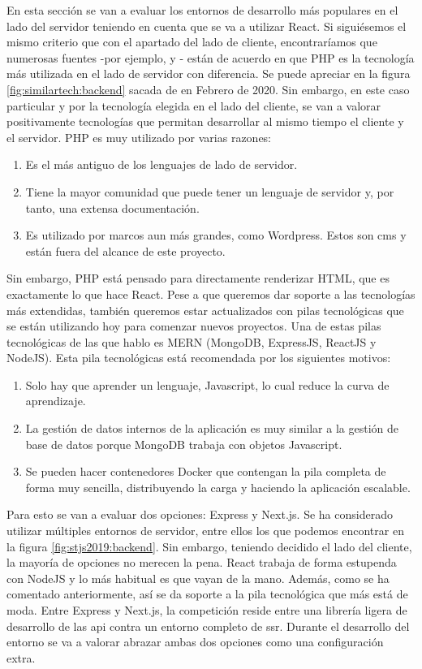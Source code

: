 En esta sección se van a evaluar los entornos de desarrollo más populares en el lado del servidor teniendo en cuenta que se va a utilizar React. Si siguiésemos el mismo criterio que con el apartado del lado de cliente, encontraríamos que numerosas fuentes -por ejemplo, \cite{BKETPF1} y \cite{BKETPF2}- están de acuerdo en que PHP es la tecnología más utilizada en el lado de servidor con diferencia. Se puede apreciar en la figura \cref{fig:similartech:backend} sacada de \cite{BKETPF2} en Febrero de 2020. Sin embargo, en este caso particular y por la tecnología elegida en el lado del cliente, se van a valorar positivamente tecnologías que permitan desarrollar al mismo tiempo el cliente y el servidor. PHP es muy utilizado por varias razones:

\begin{enumerate}
	\item Es el más antiguo de los lenguajes de lado de servidor.
	\item Tiene la mayor comunidad que puede tener un lenguaje de servidor y, por tanto, una extensa documentación.
	\item Es utilizado por marcos aun más grandes, como Wordpress. Estos son \gls{cms} y están fuera del alcance de este proyecto.
\end{enumerate}

Sin embargo, PHP está pensado para directamente renderizar HTML, que es exactamente lo que hace React. Pese a que queremos dar soporte a las tecnologías más extendidas, también queremos estar actualizados con pilas tecnológicas que se están utilizando hoy para comenzar nuevos proyectos. Una de estas pilas tecnológicas de las que hablo es MERN (MongoDB, ExpressJS, ReactJS y NodeJS). Esta pila tecnológicas está recomendada por los siguientes motivos:

\begin{enumerate}
	\item Solo hay que aprender un lenguaje, Javascript, lo cual reduce la curva de aprendizaje.
	\item La gestión de datos internos de la aplicación es muy similar a la gestión de base de datos porque MongoDB trabaja con objetos Javascript.
	\item Se pueden hacer contenedores Docker que contengan la pila completa de forma muy sencilla, distribuyendo la carga y haciendo la aplicación escalable.
\end{enumerate}

Para esto se van a evaluar dos opciones: Express y Next.js. Se ha considerado utilizar múltiples entornos de servidor, entre ellos los que podemos encontrar en la figura \cref{fig:stjs2019:backend}. Sin embargo, teniendo decidido el lado del cliente, la mayoría de opciones no merecen la pena. React trabaja de forma estupenda con NodeJS y lo más habitual es que vayan de la mano. Además, como se ha comentado anteriormente, así se da soporte a la pila tecnológica que más está de moda. Entre Express y Next.js, la competición reside entre una librería ligera de desarrollo de las \gls{api} contra un entorno completo de \gls{ssr}. Durante el desarrollo del entorno se va a valorar abrazar ambas dos opciones como una configuración extra.


